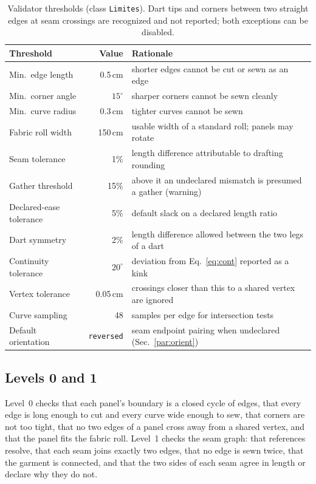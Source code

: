 \documentclass[10pt,twocolumn]{article}
\newcommand{\code}[1]{\texttt{\small #1}}
\begin{document}
\begin{table}[t]
\centering
\footnotesize
\setlength{\tabcolsep}{3pt}
\begin{tabularx}{\columnwidth}{@{}l r >{\raggedright\arraybackslash}X@{}}
\toprule
Threshold & Value & Rationale \\
\midrule
Min.\ edge length & 0.5\,cm & shorter edges cannot be cut or sewn as an edge \\
Min.\ corner angle & $15^\circ$ & sharper corners cannot be sewn cleanly \\
Min.\ curve radius & 0.3\,cm & tighter curves cannot be sewn \\
Fabric roll width & 150\,cm & usable width of a standard roll; panels may rotate \\
Seam tolerance & 1\% & length difference attributable to drafting rounding \\
Gather threshold & 15\% & above it an undeclared mismatch is presumed a gather (warning) \\
Declared-ease tolerance & 5\% & default slack on a declared length ratio \\
Dart symmetry & 2\% & length difference allowed between the two legs of a dart \\
Continuity tolerance & $20^\circ$ & deviation from Eq.~\ref{eq:cont} reported as a kink \\
Vertex tolerance & 0.05\,cm & crossings closer than this to a shared vertex are ignored \\
Curve sampling & 48 & samples per edge for intersection tests \\
Default orientation & \code{reversed} & seam endpoint pairing when undeclared (Sec.~\ref{par:orient}) \\
\bottomrule
\end{tabularx}
\caption{Validator thresholds (class \code{Limites}). Dart tips and corners
between two straight edges at seam crossings are recognized and not reported;
both exceptions can be disabled.}
\label{tab:thresholds}
\end{table}

\subsection{Levels 0 and 1}

Level~0 checks that each panel's boundary is a closed cycle of edges, that
every edge is long enough to cut and every curve wide enough to sew, that
corners are not too tight, that no two edges of a panel cross away from a
shared vertex, and that the panel fits the fabric roll. Level~1 checks the seam
graph: that references resolve, that each seam joins exactly two edges, that no
edge is sewn twice, that the garment is connected, and that the two sides of
each seam agree in length or declare why they do not.
\end{document}
